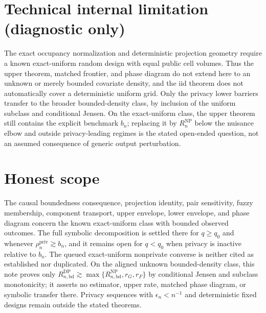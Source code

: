 \documentclass{article}
\begin{document}
\section*{Technical internal limitation (diagnostic only)}

The exact occupancy normalization and deterministic projection geometry require a known exact-uniform random design with equal public cell volumes. Thus the upper theorem, matched frontier, and phase diagram do not extend here to an unknown or merely bounded covariate density, and the iid theorem does not automatically cover a deterministic uniform grid. Only the privacy lower barriers transfer to the broader bounded-density class, by inclusion of the uniform subclass and conditional Jensen. On the exact-uniform class, the upper theorem still contains the explicit benchmark \(b_n\); replacing it by \(R_n^{\mathrm{NP}}\) below the nuisance elbow and outside privacy-leading regimes is the stated open-ended question, not an assumed consequence of generic output perturbation.

\section{Honest scope}

The causal boundedness consequence, projection identity, pair sensitivity, fuzzy membership, component transport, upper envelope, lower envelope, and phase diagram concern the known exact-uniform class with bounded observed outcomes. The full symbolic decomposition is settled there for \(q\ge q_0\) and whenever \(\rho_n^{\mathrm{priv}}\gtrsim b_n\), and it remains open for \(q<q_0\) when privacy is inactive relative to \(b_n\). The queued exact-uniform nonprivate converse is neither cited as established nor duplicated. On the aligned unknown bounded-density class, this note proves only \(R_{n,\mathrm{bd}}^{\mathrm{DP}}\gtrsim\max\{R_{n,\mathrm{bd}}^{\mathrm{NP}},r_G,r_F\}\) by conditional Jensen and subclass monotonicity; it asserts no estimator, upper rate, matched phase diagram, or symbolic transfer there. Privacy sequences with \(\epsilon_n<n^{-1}\) and deterministic fixed designs remain outside the stated theorems.
\end{document}
